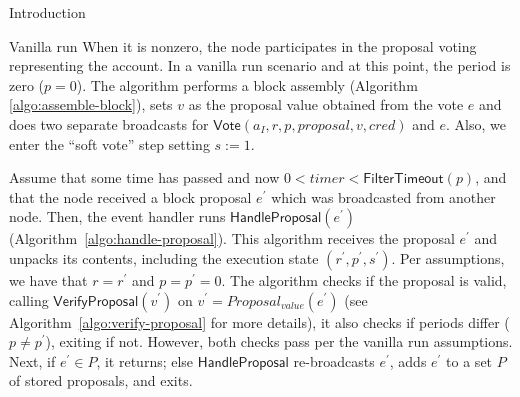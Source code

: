 \documentclass[10pt,a4paper]{article}
\begin{document}
\begin{section}{Introduction}
\begin{subsection}{Vanilla run}
When it is nonzero, the node participates in the proposal voting representing the account.
In a vanilla run scenario and at this point, the period is zero ($p=0$). 
The algorithm performs a block assembly (Algorithm \ref{algo:assemble-block}), 
sets $v$ as the proposal value obtained from the vote $e$ and does two separate 
broadcasts for $\mathsf{Vote}(a_I, r,p, proposal, v, cred)$ and $e$.
Also, we enter the ``soft vote'' step setting $s:=1$.


%


Assume that some time has passed and now $0<timer<\mathsf{FilterTimeout}(p)$, and that 
the node received a block proposal $e^\prime$ which was broadcasted from another node. 
Then, the event handler runs $\mathsf{HandleProposal}(e^\prime)$ (Algorithm~\ref{algo:handle-proposal}).
This algorithm receives the proposal $e^\prime$ and unpacks its contents,
including the execution state $(r^\prime,p^\prime,s^\prime)$.
Per assumptions, we have that $r=r^\prime$ and $p=p^\prime=0$.
The algorithm checks if the proposal is valid, calling $\mathsf{VerifyProposal}(v^\prime)$ 
on $v^\prime=Proposal_{value}(e^\prime)$ (see Algorithm~\ref{algo:verify-proposal} for more details),
it also checks if periods differ ($p\neq p^\prime$), exiting if not. However, both checks pass per 
the vanilla run assumptions.
Next, if $e^\prime\in P$, it returns; else $\mathsf{HandleProposal}$ re-broadcasts $e^\prime$, 
adds $e^\prime$ to a set $P$ of stored proposals, and exits.


\end{subsection}
\end{section}
\end{document}
